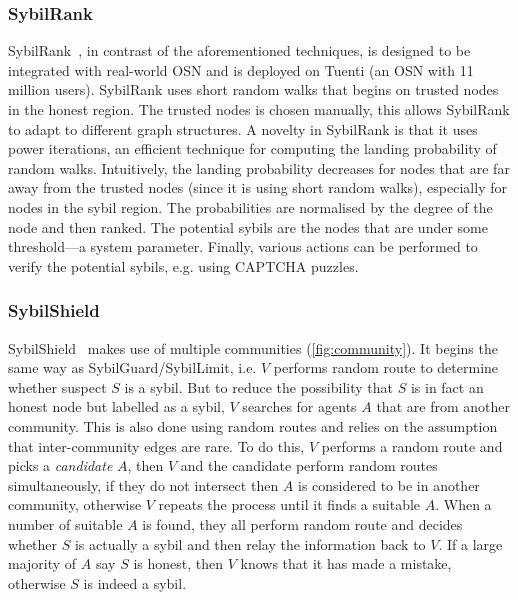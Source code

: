 
\subsubsection{SybilRank}
SybilRank~\cite{cao2012aiding}, in contrast of the aforementioned techniques, is
designed to be integrated with real-world OSN and is deployed on Tuenti (an OSN
with 11 million users). SybilRank uses short random walks that begins on trusted
nodes in the honest region. The trusted nodes is chosen manually, this allows
SybilRank to adapt to different graph structures. A novelty in SybilRank is that
it uses power iterations, an efficient technique for computing the landing
probability of random walks. Intuitively, the landing probability decreases for
nodes that are far away from the trusted nodes (since it is using short random
walks), especially for nodes in the sybil region. The probabilities are
normalised by the degree of the node and then ranked. The potential sybils are
the nodes that are under some threshold---a system parameter. Finally, various
actions can be performed to verify the potential sybils, e.g. using CAPTCHA
puzzles.

\subsubsection{SybilShield}
SybilShield~\cite{shi2013sybilshield} makes use of multiple communities
(\autoref{fig:community}). It begins the same way as
SybilGuard/SybilLimit, i.e. $V$ performs random route to determine whether
suspect $S$ is a sybil. But to reduce the possibility that $S$ is in fact an
honest node but labelled as a sybil, $V$ searches for agents $A$ that are from
another community. This is also done using random routes and relies on the
assumption that inter-community edges are rare. To do this, $V$ performs a
random route and picks a \emph{candidate} $A$, then $V$ and the candidate
perform random routes simultaneously, if they do not intersect then $A$ is
considered to be in another community, otherwise $V$ repeats the process until
it finds a suitable $A$. When a number of suitable $A$ is found, they all
perform random route and decides whether $S$ is actually a sybil and then relay
the information back to $V$. If a large majority of $A$ say $S$ is honest, then
$V$ knows that it has made a mistake, otherwise $S$ is indeed a sybil.

